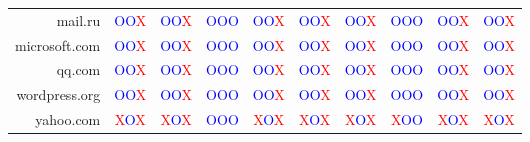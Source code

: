 \documentclass{article}
\begin{document}
\begin{landscape}
\begin{center}
\begin{tabular}{ r|c|c|c|c|c|c|c|c|c }
mail.ru   & \textcolor{blue}{O}\textcolor{blue}{O}\textcolor{red}{X} & \textcolor{blue}{O}\textcolor{blue}{O}\textcolor{red}{X} & \textcolor{blue}{O}\textcolor{blue}{O}\textcolor{blue}{O} & \textcolor{blue}{O}\textcolor{blue}{O}\textcolor{red}{X} & \textcolor{blue}{O}\textcolor{blue}{O}\textcolor{red}{X} & \textcolor{blue}{O}\textcolor{blue}{O}\textcolor{red}{X} & \textcolor{blue}{O}\textcolor{blue}{O}\textcolor{blue}{O} & \textcolor{blue}{O}\textcolor{blue}{O}\textcolor{red}{X} & \textcolor{blue}{O}\textcolor{blue}{O}\textcolor{red}{X} \\
microsoft.com   & \textcolor{blue}{O}\textcolor{blue}{O}\textcolor{red}{X} & \textcolor{blue}{O}\textcolor{blue}{O}\textcolor{red}{X} & \textcolor{blue}{O}\textcolor{blue}{O}\textcolor{blue}{O} & \textcolor{blue}{O}\textcolor{blue}{O}\textcolor{red}{X} & \textcolor{blue}{O}\textcolor{blue}{O}\textcolor{red}{X} & \textcolor{blue}{O}\textcolor{blue}{O}\textcolor{red}{X} & \textcolor{blue}{O}\textcolor{blue}{O}\textcolor{blue}{O} & \textcolor{blue}{O}\textcolor{blue}{O}\textcolor{red}{X} & \textcolor{blue}{O}\textcolor{blue}{O}\textcolor{red}{X} \\
qq.com   & \textcolor{blue}{O}\textcolor{blue}{O}\textcolor{red}{X} & \textcolor{blue}{O}\textcolor{blue}{O}\textcolor{red}{X} & \textcolor{blue}{O}\textcolor{blue}{O}\textcolor{blue}{O} & \textcolor{blue}{O}\textcolor{blue}{O}\textcolor{red}{X} & \textcolor{blue}{O}\textcolor{blue}{O}\textcolor{red}{X} & \textcolor{blue}{O}\textcolor{blue}{O}\textcolor{red}{X} & \textcolor{blue}{O}\textcolor{blue}{O}\textcolor{blue}{O} & \textcolor{blue}{O}\textcolor{blue}{O}\textcolor{red}{X} & \textcolor{blue}{O}\textcolor{blue}{O}\textcolor{red}{X} \\
wordpress.org   & \textcolor{blue}{O}\textcolor{blue}{O}\textcolor{red}{X} & \textcolor{blue}{O}\textcolor{blue}{O}\textcolor{red}{X} & \textcolor{blue}{O}\textcolor{blue}{O}\textcolor{blue}{O} & \textcolor{blue}{O}\textcolor{blue}{O}\textcolor{red}{X} & \textcolor{blue}{O}\textcolor{blue}{O}\textcolor{red}{X} & \textcolor{blue}{O}\textcolor{blue}{O}\textcolor{red}{X} & \textcolor{blue}{O}\textcolor{blue}{O}\textcolor{blue}{O} & \textcolor{blue}{O}\textcolor{blue}{O}\textcolor{red}{X} & \textcolor{blue}{O}\textcolor{blue}{O}\textcolor{red}{X} \\
yahoo.com   & \textcolor{red}{X}\textcolor{blue}{O}\textcolor{red}{X} & \textcolor{red}{X}\textcolor{blue}{O}\textcolor{red}{X} & \textcolor{blue}{O}\textcolor{blue}{O}\textcolor{blue}{O} & \textcolor{red}{X}\textcolor{blue}{O}\textcolor{red}{X} & \textcolor{red}{X}\textcolor{blue}{O}\textcolor{red}{X} & \textcolor{red}{X}\textcolor{blue}{O}\textcolor{red}{X} & \textcolor{red}{X}\textcolor{blue}{O}\textcolor{blue}{O} & \textcolor{red}{X}\textcolor{blue}{O}\textcolor{red}{X} & \textcolor{red}{X}\textcolor{blue}{O}\textcolor{red}{X} \\

 \hline
\end{tabular}
\end{center}
\end{landscape}
\end{document}

